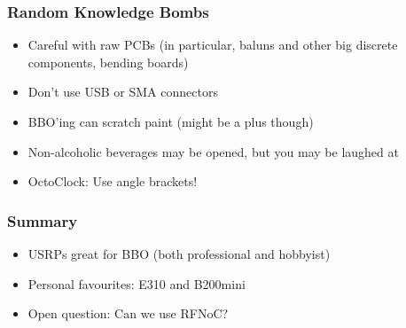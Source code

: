 \documentclass{beamer}
\begin{document}
\begin{frame}
  \frametitle{Random Knowledge Bombs}
  \begin{itemize}
    \item Careful with raw PCBs (in particular, baluns and other big discrete components, bending boards)
    \item Don't use USB or SMA connectors
    \item BBO'ing can scratch paint (might be a plus though)
    \item Non-alcoholic beverages may be opened, but you may be laughed at
    \item OctoClock: Use angle brackets!
  \end{itemize}
\end{frame}

\begin{frame}
  \frametitle{Summary}
  \begin{itemize}
    \item USRPs great for BBO (both professional and hobbyist)
    \item Personal favourites: E310 and B200mini
    \item Open question\@: Can we use RFNoC\@?
  \end{itemize}
\end{frame}
\end{document}
